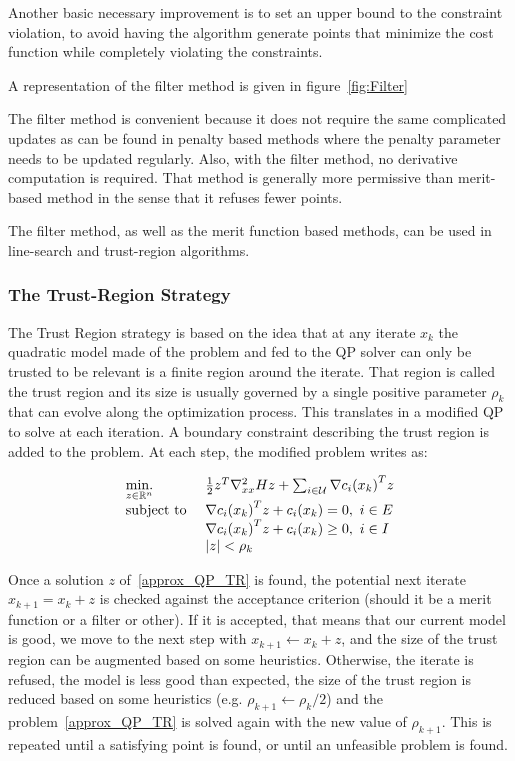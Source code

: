 Another basic necessary improvement is to set an upper bound to the constraint violation, to avoid having the algorithm generate points that minimize the cost function while completely violating the constraints.

A representation of the filter method is given in figure~\ref{fig:Filter}

The filter method is convenient because it does not require the same complicated updates as can be found in penalty based methods where the penalty parameter needs to be updated regularly.
Also, with the filter method, no derivative computation is required.
That method is generally more permissive than merit-based method in the sense that it refuses fewer points.

The filter method, as well as the merit function based methods, can be used in line-search and trust-region algorithms.

\subsubsection{The Trust-Region Strategy}
\label{ssub:the_trust_region_strategy}
The Trust Region strategy is based on the idea that at any iterate $x_k$ the quadratic model made of the problem and fed to the QP solver can only be trusted to be relevant is a finite region around the iterate.
That region is called the trust region and its size is usually governed by a single positive parameter $\rho_k$ that can evolve along the optimization process.
This translates in a modified QP to solve at each iteration.
A boundary constraint describing the trust region is added to the problem.
At each step, the modified problem writes as:

\begin{equation}
  \begin{array}{ll}
    \operatorname*{min.}\limits_{z\in \mathbb{R}^n}{} & \frac{1}{2}z^T\nabla_{xx}^2Hz + \sum_{i\in\mathcal{U}}{\nabla c_i(x_k)}^T z \\
    \text{subject to } & {\nabla c_i(x_k)}^T z+c_i(x_k)=0,\ i\in E \\
                       & {\nabla c_i(x_k)}^T z+c_i(x_k)\geq 0,\ i\in I\\
                       & |z|<\rho_k
  \end{array}
\label{approx_QP_TR}
\end{equation}

Once a solution $z$ of~\ref{approx_QP_TR} is found, the potential next iterate $x_{k+1} = x_k + z$ is checked against the acceptance criterion (should it be a merit function or a filter or other).
If it is accepted, that means that our current model is good, we move to the next step with $x_{k+1} \leftarrow x_k + z$, and the size of the trust region can be augmented based on some heuristics.
Otherwise, the iterate is refused, the model is less good than expected, the size of the trust region is reduced based on some heuristics (e.g. $\rho_{k+1}\leftarrow\rho_k /2$) and the problem~\ref{approx_QP_TR} is solved again with the new value of $\rho_{k+1}$.
This is repeated until a satisfying point is found, or until an unfeasible problem is found.

